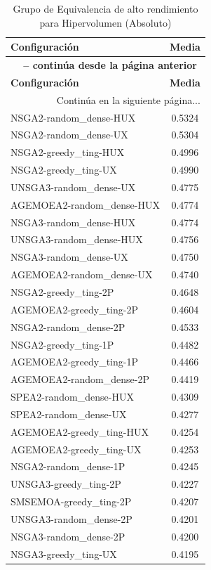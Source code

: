 \begin{longtable}{lc}
    \caption{Grupo de Equivalencia de alto rendimiento para Hipervolumen (Absoluto)}
    \label{tab:elite_hv} \\
    \toprule
    \textbf{Configuración} & \textbf{Media} \\
    \midrule
    \endfirsthead
    \multicolumn{2}{c}{{\bfseries \tablename\ \thetable{} -- continúa desde la página anterior}} \\
    \toprule
    \textbf{Configuración} & \textbf{Media} \\
    \midrule
    \endhead
    \midrule \multicolumn{2}{r}{{Continúa en la siguiente página...}} \\
    \endfoot
    \bottomrule
    \endlastfoot
    NSGA2-random\_dense-HUX & 0.5324 \\
NSGA2-random\_dense-UX & 0.5304 \\
NSGA2-greedy\_ting-HUX & 0.4996 \\
NSGA2-greedy\_ting-UX & 0.4990 \\
UNSGA3-random\_dense-UX & 0.4775 \\
AGEMOEA2-random\_dense-HUX & 0.4774 \\
NSGA3-random\_dense-HUX & 0.4774 \\
UNSGA3-random\_dense-HUX & 0.4756 \\
NSGA3-random\_dense-UX & 0.4750 \\
AGEMOEA2-random\_dense-UX & 0.4740 \\
NSGA2-greedy\_ting-2P & 0.4648 \\
AGEMOEA2-greedy\_ting-2P & 0.4604 \\
NSGA2-random\_dense-2P & 0.4533 \\
NSGA2-greedy\_ting-1P & 0.4482 \\
AGEMOEA2-greedy\_ting-1P & 0.4466 \\
AGEMOEA2-random\_dense-2P & 0.4419 \\
SPEA2-random\_dense-HUX & 0.4309 \\
SPEA2-random\_dense-UX & 0.4277 \\
AGEMOEA2-greedy\_ting-HUX & 0.4254 \\
AGEMOEA2-greedy\_ting-UX & 0.4253 \\
NSGA2-random\_dense-1P & 0.4245 \\
UNSGA3-greedy\_ting-2P & 0.4227 \\
SMSEMOA-greedy\_ting-2P & 0.4207 \\
UNSGA3-random\_dense-2P & 0.4201 \\
NSGA3-random\_dense-2P & 0.4200 \\
NSGA3-greedy\_ting-UX & 0.4195 \\
\end{longtable}

